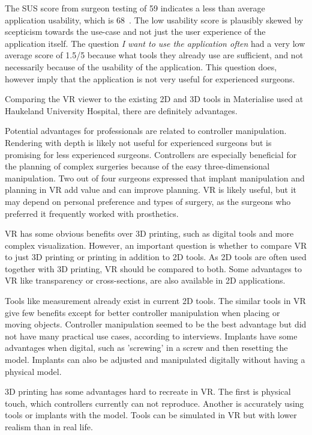 \documentclass[a4paper]{report}
\begin{document}
The SUS score from surgeon testing of 59 indicates a less than average application usability, which is 68~\cite{system_usability_scale_sus_system_2013}. The low usability score is plausibly skewed by scepticism towards the use-case and not just the user experience of the application itself. The question \emph{I want to use the application often} had a very low average score of 1.5/5 because what tools they already use are sufficient, and not necessarily because of the usability of the application. This question does, however imply that the application is not very useful for experienced surgeons.

Comparing the VR viewer to the existing 2D and 3D tools in Materialise used at Haukeland University Hospital, there are definitely advantages.

Potential advantages for professionals are related to controller manipulation. Rendering with depth is likely not useful for experienced surgeons but is promising for less experienced surgeons.
Controllers are especially beneficial for the planning of complex surgeries because of the easy three-dimensional manipulation.
Two out of four surgeons expressed that implant manipulation and planning in VR add value and can improve planning. VR is likely useful, but it may depend on personal preference and types of surgery, as the surgeons who preferred it frequently worked with prosthetics.



VR has some obvious benefits over 3D printing, such as digital tools and more complex visualization.
However, an important question is whether to compare VR to just 3D printing or printing in addition to 2D tools. As 2D tools are often used together with 3D printing, VR should be compared to both. Some advantages to VR like transparency or cross-sections, are also available in 2D applications.

Tools like measurement already exist in current 2D tools. The similar tools in VR give few benefits except for better controller manipulation when placing or moving objects.
Controller manipulation seemed to be the best advantage but did not have many practical use cases, according to interviews.
Implants have some advantages when digital, such as 'screwing' in a screw and then resetting the model. Implants can also be adjusted and manipulated digitally without having a physical model.

3D printing has some advantages hard to recreate in VR. The first is physical touch, which controllers currently can not reproduce. Another is accurately using tools or implants with the model. Tools can be simulated in VR but with lower realism than in real life.
\end{document}
